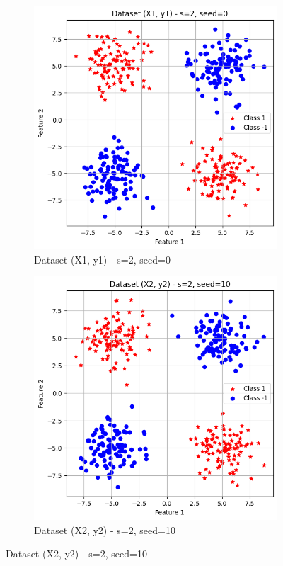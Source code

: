 \documentclass[a4paper,12pt]{article}
\begin{document}
\begin{figure}[H]
    \centering
    \captionsetup[subfigure]{list=true} %

    \begin{subfigure}{0.45\textwidth}
        \centering
        \includegraphics[width=\textwidth]{PR dataset.png}
        \caption{Dataset (X1, y1) - s=2, seed=0}
        \label{fig:dataset1}
    \end{subfigure}
    \hfill
    \begin{subfigure}{0.45\textwidth}
        \centering
        \includegraphics[width=\textwidth]{PR dataset2.png}
        \caption{Dataset (X2, y2) - s=2, seed=10}
        \label{fig:dataset2}
    \end{subfigure}
    

\end{figure}
\end{document}
